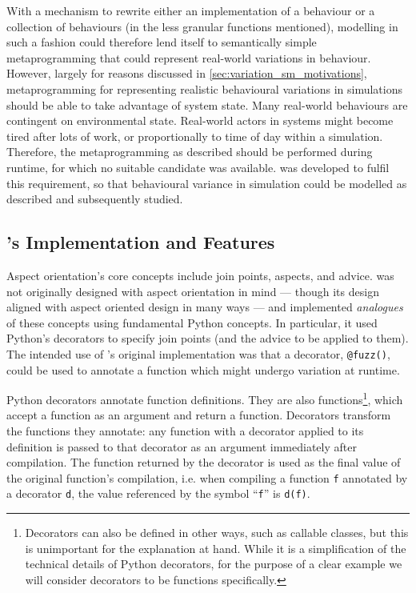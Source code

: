 With a mechanism to rewrite either an implementation of a behaviour or a
collection of behaviours (in the less granular functions mentioned), modelling
in such a fashion could therefore lend itself to semantically simple
metaprogramming that could represent real-world variations in behaviour.
However, largely for reasons discussed in \cref{sec:variation_sm_motivations},
metaprogramming for representing realistic behavioural variations in
\sociotechnical simulations should be able to take advantage of system state.
Many real-world behaviours are contingent on environmental state. Real-world
actors in \sociotechnical systems might become tired after lots of work, or
proportionally to time of day within a simulation. Therefore, the
metaprogramming as described should be performed during runtime, for which no
suitable candidate was available. \pdsf was developed to fulfil this
requirement, so that behavioural variance in \sociotechnical simulation could be
modelled as described and subsequently studied.

\subsection{\pdsf{}'s Implementation and Features}


Aspect orientation's core concepts include join points, aspects, and advice.
\pdsf was not originally designed with aspect orientation in mind --- though its
design aligned with aspect oriented design in many ways --- and implemented
\emph{analogues} of these concepts using fundamental Python concepts. In
particular, it used Python's decorators to specify join points (and the advice
to be applied to them). The intended use of \pdsf{}'s original implementation
was that a decorator, \lstinline{@fuzz()}, could be used to annotate a function
which might undergo variation at runtime.

Python decorators annotate function definitions. They are also
functions\footnote{Decorators can also be defined in other ways, such as
callable classes, but this is unimportant for the explanation at hand. While it
is a simplification of the technical details of Python decorators, for the
purpose of a clear example we will consider decorators to be functions
specifically.}, which accept a function as an argument and return a function.
Decorators transform the functions they annotate: any function with a decorator
applied to its definition is passed to that decorator as an argument immediately
after compilation. The function returned by the decorator is used as the final
value of the original function's compilation, i.e. when compiling a function
\lstinline{f} annotated by a decorator \lstinline{d}, the value referenced by
the symbol ``\lstinline{f}'' is \lstinline{d(f)}.

